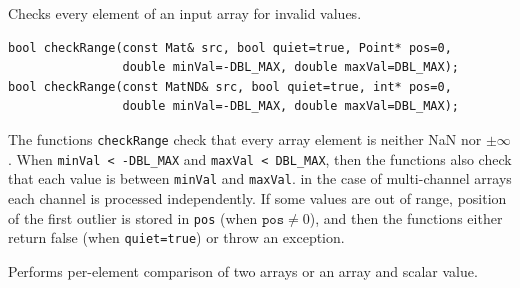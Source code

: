\label{checkRange}
Checks every element of an input array for invalid values.

\begin{lstlisting}
bool checkRange(const Mat& src, bool quiet=true, Point* pos=0,
                double minVal=-DBL_MAX, double maxVal=DBL_MAX);
bool checkRange(const MatND& src, bool quiet=true, int* pos=0,
                double minVal=-DBL_MAX, double maxVal=DBL_MAX);
\end{lstlisting}
\begin{description}
\end{description}

The functions \texttt{checkRange} check that every array element is
neither NaN nor $ \pm \infty $. When \texttt{minVal < -DBL\_MAX} and \texttt{maxVal < DBL\_MAX}, then the functions also check that
each value is between \texttt{minVal} and \texttt{maxVal}. in the case of multi-channel arrays each channel is processed independently.
If some values are out of range, position of the first outlier is stored in \texttt{pos} (when $\texttt{pos}\ne0$), and then the functions either return false (when \texttt{quiet=true}) or throw an exception.


\label{compare}
Performs per-element comparison of two arrays or an array and scalar value.

